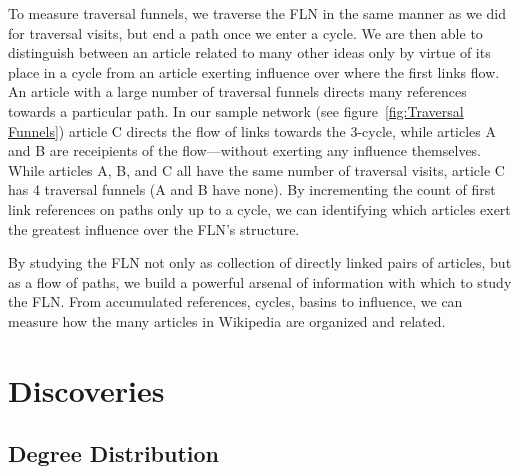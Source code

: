 \documentclass[pre,twocolumn,twoside,superscriptaddress,floatfix, aps, 10pt]{revtex4-1}
\begin{document}
To measure traversal funnels, we traverse the FLN in the same manner as we 
did for traversal visits, but end a path once we enter a cycle.
We are then able to distinguish between an article related to many other ideas
only by virtue of its place in a cycle from an article exerting influence over where the first links flow. 
An article with a large number of traversal funnels directs many references
towards a particular path. In our sample network 
(see figure~\ref{fig:Traversal Funnels}) article C 
directs the flow of links towards the 3-cycle, while articles A and B are 
receipients of the flow---without exerting any influence themselves. 
While articles A, B, and C all have the same number of traversal visits, 
article C has 4 traversal funnels (A and B have none). By incrementing the count of 
first link references on paths only up to a cycle, we can identifying which articles
exert the greatest influence over the FLN's structure.

By studying the FLN not only as collection of directly linked pairs of articles, but
as a flow of paths, 
we build a powerful arsenal of information with which to study the FLN. 
From accumulated references, cycles, basins to influence, we can measure how the many articles in Wikipedia are organized and related.





\section{Discoveries}


\subsection{Degree Distribution}
\end{document}
